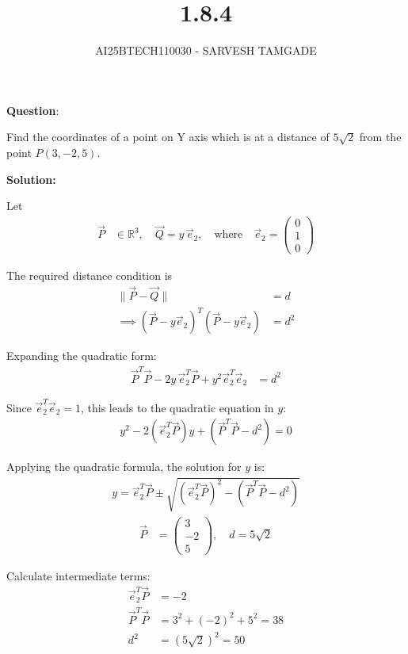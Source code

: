 \documentclass{article}
\title{1.8.4}
\author{AI25BTECH110030 - SARVESH TAMGADE}
\begin{document}
{\let\newpage\relax\maketitle}

\textbf{Question}:

Find the coordinates of a point on Y axis which is at a distance of \( 5\sqrt{2} \) from the point \( P(3, -2, 5) \).

\textbf{Solution:}

Let 
\begin{align}
\vec{P} &\in \mathbb{R}^3, \quad \vec{Q} = y\,\vec{e}_2, \quad \text{where} \quad \vec{e}_2 = \begin{pmatrix} 0 \\ 1 \\ 0 \end{pmatrix}
\end{align}

The required distance condition is
\begin{align}
\|\vec{P} - \vec{Q}\| &= d \\
\implies (\vec{P} - y\vec{e}_2)^T (\vec{P} - y\vec{e}_2) &= d^2
\end{align}

Expanding the quadratic form:
\begin{align}
\vec{P}^T \vec{P} - 2y\,\vec{e}_2^T \vec{P} + y^2 \vec{e}_2^T \vec{e}_2 &= d^2
\end{align}

Since \(\vec{e}_2^T \vec{e}_2 = 1\), this leads to the quadratic equation in \( y \):
\begin{align}
y^2 - 2(\vec{e}_2^T \vec{P}) y + \left(\vec{P}^T \vec{P} - d^2\right) = 0
\end{align}

Applying the quadratic formula, the solution for \( y \) is:
\begin{align}
y = \vec{e}_2^T \vec{P} \pm \sqrt{\left(\vec{e}_2^T \vec{P}\right)^2 - \left(\vec{P}^T \vec{P} - d^2\right)}
\end{align}
\begin{align}
\vec{P} &= \begin{pmatrix}3 \\ -2 \\ 5\end{pmatrix}, \quad d = 5\sqrt{2}
\end{align}

Calculate intermediate terms:
\begin{align}
\vec{e}_2^T \vec{P} &= -2 \\
\vec{P}^T \vec{P} &= 3^2 + (-2)^2 + 5^2 = 38 \\
d^2 &= (5\sqrt{2})^2 = 50
\end{align}
\end{document}
